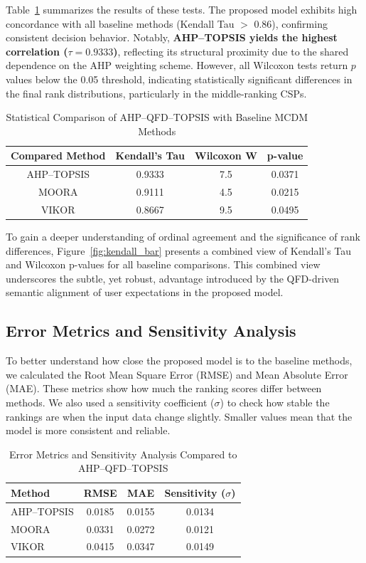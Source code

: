 \documentclass[twocolumn]{svjour3}
\begin{document}
Table~\ref{tab:stat_validation} summarizes the results of these tests. The proposed model exhibits high concordance with all baseline methods (Kendall Tau $>$ 0.86), confirming consistent decision behavior. Notably, \textbf{AHP–TOPSIS yields the highest correlation ($\tau = 0.9333$)}, reflecting its structural proximity due to the shared dependence on the AHP weighting scheme. However, all Wilcoxon tests return $p$ values below the 0.05 threshold, indicating statistically significant differences in the final rank distributions, particularly in the middle-ranking CSPs.

\begin{table}[H]
\centering
\caption{Statistical Comparison of AHP–QFD–TOPSIS with Baseline MCDM Methods}
\label{tab:stat_validation}
\begin{tabular}{|c|c|c|c|}
\hline
\textbf{Compared Method} & \textbf{Kendall's Tau} & \textbf{Wilcoxon W} & \textbf{p-value} \\
\hline
AHP–TOPSIS & 0.9333 & 7.5 & 0.0371 \\
MOORA      & 0.9111 & 4.5 & 0.0215 \\
VIKOR      & 0.8667 & 9.5 & 0.0495 \\
\hline
\end{tabular}
\end{table}

To gain a deeper understanding of ordinal agreement and the significance of rank differences, Figure~\ref{fig:kendall_bar} presents a combined view of Kendall’s Tau and Wilcoxon p-values for all baseline comparisons. This combined view underscores the subtle, yet robust, advantage introduced by the QFD-driven semantic alignment of user expectations in the proposed model.


\subsection{Error Metrics and Sensitivity Analysis}

To better understand how close the proposed model is to the baseline methods, we calculated the Root Mean Square Error (RMSE) and Mean Absolute Error (MAE). These metrics show how much the ranking scores differ between methods. We also used a sensitivity coefficient ($\sigma$) to check how stable the rankings are when the input data change slightly. Smaller values mean that the model is more consistent and reliable.

\begin{table}[h!]
\centering
\caption{Error Metrics and Sensitivity Analysis Compared to AHP--QFD--TOPSIS}
\begin{tabular}{lccc}
\hline
\textbf{Method} & \textbf{RMSE} & \textbf{MAE} & \textbf{Sensitivity ($\sigma$)} \\
\hline
AHP--TOPSIS & 0.0185 & 0.0155 & 0.0134 \\
MOORA       & 0.0331 & 0.0272 & 0.0121 \\
VIKOR       & 0.0415 & 0.0347 & 0.0149 \\
\hline
\end{tabular}
\end{table}
\end{document}
